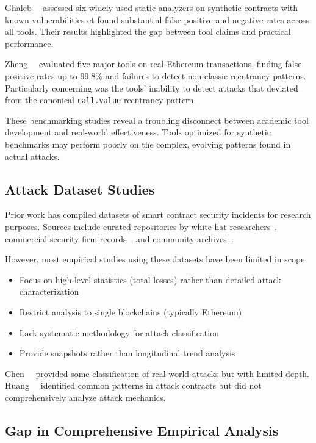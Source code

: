 Ghaleb~\etal~\cite{survey:static-analysis} assessed six widely-used static analyzers on synthetic contracts with known vulnerabilities et found substantial false positive and negative rates across all tools. Their results highlighted the gap between tool claims and practical performance.

Zheng~\etal~\cite{turn-the-rudder} evaluated five major tools on real Ethereum transactions, finding false positive rates up to 99.8\% and failures to detect non-classic reentrancy patterns. Particularly concerning was the tools' inability to detect attacks that deviated from the canonical \lstinline{call.value} reentrancy pattern.

These benchmarking studies reveal a troubling disconnect between academic tool development and real-world effectiveness. Tools optimized for synthetic benchmarks may perform poorly on the complex, evolving patterns found in actual attacks.

\subsection{Attack Dataset Studies}

Prior work has compiled datasets of smart contract security incidents for research purposes. Sources include curated repositories by white-hat researchers~\cite{reentrancy-list-pcaversaccio}, commercial security firm records~\cite{blocksec-security-incidents}, and community archives~\cite{slowmist-hacked}.

However, most empirical studies using these datasets have been limited in scope:
\begin{itemize}
    \item Focus on high-level statistics (\eg total losses) rather than detailed attack characterization
    \item Restrict analysis to single blockchains (typically Ethereum)
    \item Lack systematic methodology for attack classification
    \item Provide snapshots rather than longitudinal trend analysis
\end{itemize}

Chen~\etal~\cite{turn-the-rudder} provided some classification of real-world attacks but with limited depth. Huang~\etal~\cite{attack-contract-detection} identified common patterns in attack contracts but did not comprehensively analyze attack mechanics.

\subsection{Gap in Comprehensive Empirical Analysis}


